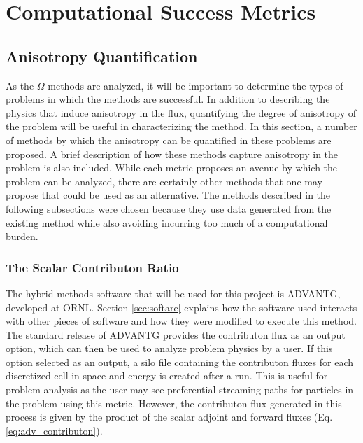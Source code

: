 \newcommand{\anglevars}{x,y,z,E_g,\theta,\varphi}
\newcommand{\scalarvars}{x,y,z,E_g}


\section{Computational Success Metrics}
\label{sec:successmetrics}
\subsection{Anisotropy Quantification}
\label{sec:anisotropy_quant}

As the $\Omega$-methods are analyzed, it will be important to determine the
types of problems in which the methods are successful. In addition to describing
the physics that induce anisotropy in the flux, quantifying the degree of
anisotropy of the problem will be useful in characterizing the method. In this
section, a number
of methods by which the anisotropy can be quantified in these problems are
proposed. A brief description of how these methods capture anisotropy in the
problem is also included. While each metric proposes an avenue by which the
problem can be analyzed, there are certainly other methods that one may propose
that could be used as an alternative. The methods described in the following
subsections were chosen because they use data generated from the existing method
while also avoiding incurring too much of a computational burden.

\subsubsection{The Scalar Contributon Ratio}

The hybrid methods software that will be used for this project is ADVANTG,
developed at ORNL. Section \ref{sec:softare} explains how the software used
interacts with other pieces of software
and how they were modified to execute this method.
The standard release of ADVANTG provides the contributon flux as an output
option, which can then be used to analyze problem physics by a user.
If this option selected as an output, a silo file containing
the contributon fluxes for each discretized cell in space and energy  is
created after
a run. This is useful for problem analysis as the user may see
preferential streaming paths for particles in the problem using this metric.
However, the contributon flux generated in this process is given by the product
of the scalar adjoint and forward fluxes (Eq. \ref{eq:adv_contributon}).

